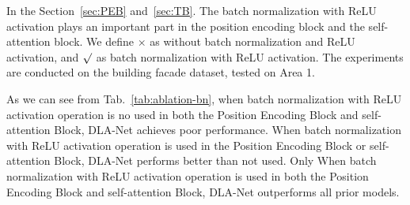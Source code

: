\documentclass[review]{elsarticle}
\begin{document}
In the Section~\ref{sec:PEB} and~\ref{sec:TB}. The batch normalization with ReLU activation plays an important part in the position encoding block and the self-attention block. We define $\times$  as without batch normalization and ReLU activation, and $\surd$ as batch normalization with ReLU activation. The experiments are conducted on the building facade dataset, tested on  Area 1.

\begin{table}[!htbp] \centering \normalsize
\end{table}

As we can see from Tab.~\ref{tab:ablation-bn}, when batch normalization with ReLU activation operation is no used in both the Position Encoding Block and self-attention Block, DLA-Net achieves poor performance. When batch normalization with ReLU activation operation is used in the Position Encoding Block or self-attention Block, DLA-Net performs better than not used. Only When batch normalization with ReLU activation operation is used in both the Position Encoding Block and self-attention Block, DLA-Net outperforms all prior models.
\end{document}
